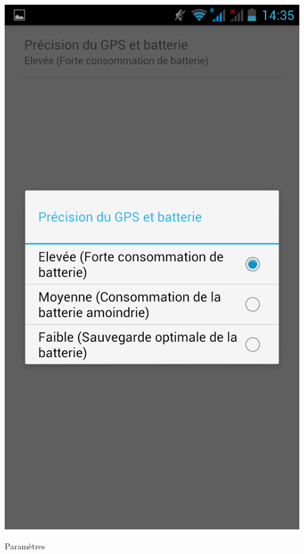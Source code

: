 \begin{appendices}
\begin{multicols}{3}
\begin{img}
  \includegraphics[scale=0.3]{img/parametres.jpg}
  \caption{Paramètres}
\end{img}
\end{multicols}

\end{appendices}


